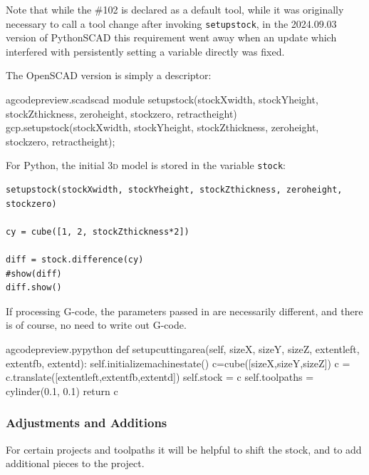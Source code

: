 \documentclass{ltxdoc}
\begin{document}
Note that while the \#102 is declared as a default tool, while it was originally necessary to call a tool change after invoking \verb|setupstock|, in the 2024.09.03 version of PythonSCAD this requirement went away when an update which interfered with persistently setting a variable directly was fixed.

The OpenSCAD version is simply a descriptor:

\lstset{firstnumber=\thegcpscad}
\begin{writecode}{a}{gcodepreview.scad}{scad}
module setupstock(stockXwidth, stockYheight, stockZthickness, zeroheight, stockzero, retractheight) {
    gcp.setupstock(stockXwidth, stockYheight, stockZthickness, zeroheight, stockzero, retractheight);
}

\end{writecode}
\addtocounter{gcpscad}{4}

For Python, the initial \textsc{3d} model is stored in the variable \verb|stock|:

\begin{verbatim}
setupstock(stockXwidth, stockYheight, stockZthickness, zeroheight, stockzero)

cy = cube([1, 2, stockZthickness*2])

diff = stock.difference(cy)
#show(diff)
diff.show()
\end{verbatim}

If processing G-code, the parameters passed in are necessarily different, and there is of course, no need to write out G-code. 

\lstset{firstnumber=\thegcpy}
\begin{writecode}{a}{gcodepreview.py}{python}
    def setupcuttingarea(self, sizeX, sizeY, sizeZ, extentleft, extentfb, extentd):
        self.initializemachinestate() 
        c=cube([sizeX,sizeY,sizeZ])
        c = c.translate([extentleft,extentfb,extentd])
        self.stock = c
        self.toolpaths = cylinder(0.1, 0.1)
        return c
        
\end{writecode}
\addtocounter{gcpy}{8}

\subsubsection*{Adjustments and Additions}

For certain projects and toolpaths it will be helpful to shift the stock, and to add additional pieces to the project.
\end{document}

